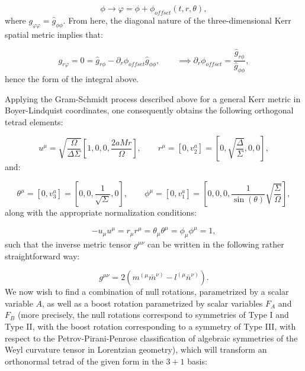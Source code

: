\documentclass{article}
\begin{document}
\begin{equation}
\phi \to \varphi = \phi + \phi_{offset} \left( t, r, \theta \right),
\end{equation}
where ${g_{\varphi \varphi} = \hat{g}_{\phi \phi}}$. From here, the diagonal nature of the three-dimensional Kerr spatial metric implies that:

\begin{equation}
g_{r \varphi} = 0 = \hat{g}_{r \phi} - \partial_r \phi_{offset} \hat{g}_{\phi \phi}, \qquad \implies \partial_r \phi_{offset} = \frac{\hat{g}_{r \phi}}{\hat{g}_{\phi \phi}},
\end{equation}
hence the form of the integral above.

Applying the Gram-Schmidt process described above for a general Kerr metric in Boyer-Lindquist coordinates, one consequently obtains the following orthogonal tetrad elements:

\begin{equation}
u^{\mu} = \sqrt{\frac{\Omega}{\Delta \Sigma}} \left[ 1, 0, 0, \frac{2 a M r}{\Omega} \right], \qquad r^{\mu} = \left[ 0, v_{2}^{a} \right] = \left[ 0, 
\sqrt{\frac{\Delta}{\Sigma}}, 0, 0 \right],
\end{equation}
and:

\begin{equation}
\theta^{\mu} = \left[ 0, v_{3}^{a} \right] = \left[ 0, 0, \frac{1}{\sqrt{\Sigma}}, 0 \right], \qquad \phi^{\mu} = \left[ 0, v_{1}^{a} \right] = \left[ 0, 0, 0, \frac{1}{\sin \left( \theta \right)} \sqrt{\frac{\Sigma}{\Omega}} \right],
\end{equation}
along with the appropriate normalization conditions:

\begin{equation}
- u_{\mu} u^{\mu} = r_{\mu} r^{\mu} = \theta_{\mu} \theta^{\mu} = \phi_{\mu} \phi^{\mu} = 1,
\end{equation}
such that the inverse metric tensor ${g^{\mu \nu}}$ can be written in the following rather straightforward way:

\begin{equation}
g^{\mu \nu} = 2 \left( m^{\left( \mu \right.} \bar{m}^{\left. \nu \right)} - l^{\left( \mu \right.} \bar{n}^{\left. \nu \right)} \right).
\end{equation}
We now wish to find a combination of null rotations, parametrized by a scalar variable $A$, as well as a boost rotation parametrized by scalar variables ${F_{A}}$ and ${F_{B}}$ (more precisely, the null rotations correspond to symmetries of Type I and Type II, with the boost rotation corresponding to a symmetry of Type III, with respect to the Petrov-Pirani-Penrose classification of algebraic symmetries of the Weyl curvature tensor in Lorentzian geometry\cite{petrov}\cite{pirani}\cite{penrose}), which will transform an orthonormal tetrad of the given form in the ${3 + 1}$ basis:
\end{document}

